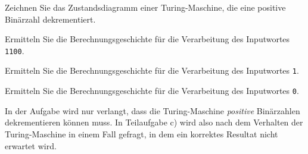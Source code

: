 Zeichnen Sie das Zustandsdiagramm einer Turing-Maschine, die eine
positive Binärzahl dekrementiert.
\begin{teilaufgaben}
\item
Ermitteln Sie die Berechnungsgeschichte für die Verarbeitung des Inputwortes
\texttt{1100}.
\item
Ermitteln Sie die Berechnungsgeschichte für die Verarbeitung des Inputwortes
\texttt{1}.
\item
Ermitteln Sie die Berechnungsgeschichte für die Verarbeitung des Inputwortes
\texttt{0}.
\end{teilaufgaben}

\begin{hinweis}
In der Aufgabe wird nur verlangt, dass die Turing-Maschine {\em positive}
Binärzahlen dekrementieren können muss.
In Teilaufgabe c) wird also nach dem Verhalten der Turing-Maschine in einem
Fall gefragt, in dem ein korrektes Resultat nicht erwartet wird.
\end{hinweis}


